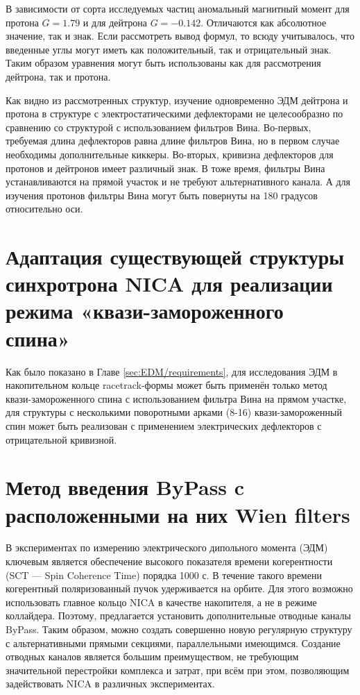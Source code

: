 \par В зависимости от сорта исследуемых частиц аномальный магнитный момент для протона $G=1.79$ и для дейтрона $G=-0.142$. Отличаются как абсолютное значение, так и знак. Если рассмотреть вывод формул, то всюду учитывалось, что введенные углы могут иметь как положительный, так и отрицательный знак. Таким образом уравнения могут быть использованы как для рассмотрения дейтрона, так и протона. 

\par  Как видно из рассмотренных структур, изучение одновременно ЭДМ дейтрона и протона в структуре с электростатическими дефлекторами не целесообразно по сравнению со структурой с использованием фильтров Вина. Во-первых, требуемая длина дефлекторов равна длине фильтров Вина, но в первом случае необходимы дополнительные киккеры. Во-вторых, кривизна дефлекторов для протонов и дейтронов имеет различный знак. В тоже время, фильтры Вина устанавливаются на прямой участок и не требуют альтернативного канала. А для изучения протонов фильтры Вина могут быть повернуты на 180 градусов относительно оси.

	\section{Адаптация существующей структуры синхротрона NICA для реализации режима «квази-замороженного спина»}\label{sec:EDM/QFS}

\par Как было показано в Главе \ref{sec:EDM/requirements}, для исследования ЭДМ в накопительном кольце racetrack-формы может быть применён только метод квази-замороженного спина с использованием фильтра Вина на прямом участке, для структуры с несколькими поворотными арками (8-16) квази-замороженный спин может быть реализован с применением электрических дефлекторов с отрицательной кривизной.

	\section{Метод введения ByPass c расположенными на них Wien filters}\label{sec:EDM/Wien_filter}

\par В экспериментах по измерению электрического дипольного момента (ЭДМ) ключевым является обеспечение высокого показателя времени когерентности (SCT — Spin Coherence Time) порядка 1000 с. В течение такого времени когерентный поляризованный пучок удерживается на орбите. Для этого возможно использовать главное кольцо NICA в качестве накопителя, а не в режиме коллайдера. Поэтому, предлагается установить дополнительные отводные каналы ByPass. Таким образом, можно создать совершенно новую регулярную структуру с альтернативными прямыми секциями, параллельными имеющимся. Создание отводных каналов является большим преимуществом, не требующим значительной перестройки комплекса и затрат, при всём при этом, позволяющим задействовать NICA в различных экспериментах.

